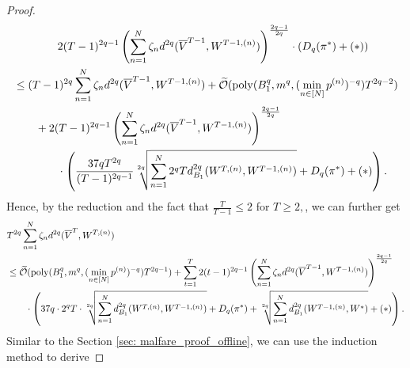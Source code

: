 \begin{proof}
\begin{align*}
&\qquad\qquad  2(T-1)^{2q-1}\left(\sum_{n=1}^N \zeta_n d^{2q}(\overline{V}^{T-1}, W^{T-1,(n)})\right)^{\frac{2q-1}{2q}} \cdot \left(D_{q}(\pi^*) + (\ast)\right)\\
&\le (T-1)^{2q} \sum_{n=1}^N \zeta_nd^{2q}(\overline{V}^{T-1}, W^{T-1,(n)})  + \widetilde{\mathcal{O}}(\mathrm{poly}(B_1^{q},m^{q}, (\min_{n \in [N]}p^{(n)})^{-q})T^{2q-2}) \\&\qquad +2(T-1)^{2q-1}\left(\sum_{n=1}^N \zeta_nd^{2q}(\overline{V}^{T-1}, W^{T-1,(n)})\right)^{\frac{2q-1}{2q}} \\
&\qquad\qquad   \cdot \left(\frac{37qT^{2q}}{(T-1)^{2q-1}}\sqrt[2q]{\sum_{n=1}^N 2^q T d_{B_1}^{2q}(W^{T,(n)}, W^{T-1,(n)}) } + D_{q}(\pi^*) + (\ast)\right).
\end{align*}
Hence, by the reduction and the fact that $\frac{T}{T-1}\le 2$ for $T \ge 2,$, we can further get 
\begin{align*}
    &T^{2q}\sum_{n=1}^N \zeta_n d^{2q}(\overline{V}^T, W^{T,(n)})\nonumber\\&\le\widetilde{\mathcal{O}}(\mathrm{poly}(B_1^{q},m^{q}, (\min_{n \in [N]}p^{(n)})^{-q})T^{2q-1}) + \sum_{t=1}^{T}2(t-1)^{2q-1}\left(\sum_{n=1}^N \zeta_nd^{2q}(\overline{V}^{T-1}, W^{T-1,(n)})\right)^{\frac{2q-1}{2q}} \\
&\qquad   \cdot \left(37q\cdot 2^q T\cdot \sqrt[2q]{\sum_{n=1}^N d_{B_1}^{2q}(W^{T,(n)}, W^{T-1,(n)}) } + D_{q}(\pi^*) + \sqrt[2q]{\sum_{n=1}^N d^{2q}_{B_1}(W^{T-1,(n)}, W^*)}+(\ast)\right).
\end{align*}
Similar to the Section \ref{sec: malfare_proof_offline}, we can use the induction method to derive



\end{proof}
